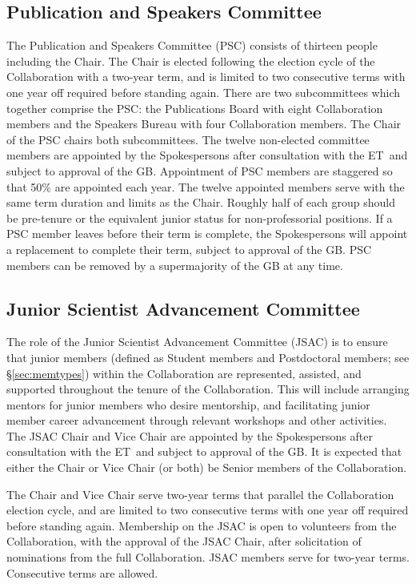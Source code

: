 \documentclass[12pt]{article}
\newcommand{\exec}{{Executive Team}}
\newcommand{\shorte}{{ET}}  %
\begin{document}
\subsection{Publication and Speakers  Committee}
\label{sec:pubcouncil}

The Publication and Speakers Committee (PSC) consists of thirteen people including the Chair. The Chair is elected following the election cycle of the Collaboration with a two-year term, and is limited to two consecutive terms with one year off required before standing again. There are two subcommittees which together comprise the PSC: the Publications Board with eight Collaboration members and the Speakers Bureau with four Collaboration members. The Chair of the PSC chairs both subcommittees. The twelve non-elected committee members are appointed by the Spokespersons after consultation with the \shorte\ and subject to approval of the GB. Appointment of PSC members are staggered so that 50\% are appointed each year. The twelve appointed members serve with the same term duration and limits as the Chair. Roughly half of each group should be pre-tenure or the equivalent junior status for non-professorial positions. If a PSC member leaves before their term is complete, the Spokespersons
will appoint a replacement to complete their term, subject to approval of the GB. PSC members can be removed by a supermajority of the GB at any time.  

\subsection{Junior Scientist Advancement Committee}

The role of the Junior Scientist Advancement Committee (JSAC) is to ensure that junior members (defined as Student members and Postdoctoral members; see \S\ref{sec:memtypes}) within the Collaboration are represented, assisted, and supported throughout the  tenure of the Collaboration. This will include arranging mentors for junior members who desire mentorship, and facilitating junior member career advancement through relevant workshops and other activities. The JSAC Chair and Vice Chair are appointed by the Spokespersons after consultation with the \shorte\ and subject to approval of the GB. It is expected that either the Chair or Vice Chair (or both) be Senior members of the Collaboration.

The Chair and Vice Chair serve two-year terms that parallel the Collaboration election cycle, and are limited to two consecutive terms with one year off required before standing again. Membership on the JSAC is open to volunteers from the Collaboration, with the approval of the JSAC Chair, after solicitation of nominations from the full Collaboration. JSAC members serve for two-year terms. Consecutive terms are allowed.
\end{document}

